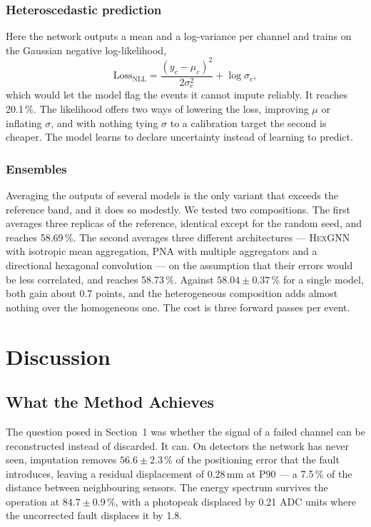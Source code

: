 \documentclass[10pt,conference]{IEEEtran}
\begin{document}
\subsubsection{Heteroscedastic prediction}
Here the network outputs a mean and a log-variance per channel and trains on the
Gaussian negative log-likelihood,
%
\begin{equation}
\mathrm{Loss}_{\mathrm{NLL}} = \frac{(y_{c} - \mu_{c})^{2}}{2\sigma_{c}^{2}}
                             + \log \sigma_{c},
\label{eq:nll}
\end{equation}
%
which would let the model flag the events it cannot impute reliably. It reaches
20.1\,\%. The likelihood offers two ways of lowering the loss, improving $\mu$
or inflating $\sigma$, and with nothing tying $\sigma$ to a calibration target
the second is cheaper. The model learns to declare uncertainty instead of
learning to predict.

\subsubsection{Ensembles}
Averaging the outputs of several models is the only variant that exceeds the
reference band, and it does so modestly. We tested two compositions. The first
averages three replicas of the reference, identical except for the random seed,
and reaches 58.69\,\%. The second averages three different architectures ---
\textsc{HexGNN} with isotropic mean aggregation, PNA with multiple aggregators
and a directional hexagonal convolution --- on the assumption that their errors
would be less correlated, and reaches 58.73\,\%. Against $58.04 \pm 0.37$\,\%
for a single model, both gain about 0.7 points, and the heterogeneous
composition adds almost nothing over the homogeneous one. The cost is three
forward passes per event.


\section{Discussion}
\label{sec:discussion}

\subsection{What the Method Achieves}

The question posed in Section~1 was whether the signal of a failed channel can
be reconstructed instead of discarded. It can. On detectors the network has
never seen, imputation removes $56.6 \pm 2.3$\,\% of the positioning error that
the fault introduces, leaving a residual displacement of 0.28\,mm at P90 --- a
7.5\,\% of the distance between neighbouring sensors. The energy spectrum
survives the operation at $84.7 \pm 0.9$\,\%, with a photopeak displaced by
0.21 ADC units where the uncorrected fault displaces it by 1.8.
\end{document}

